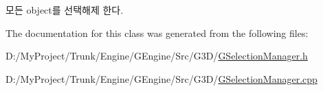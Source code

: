 \begin{DoxyItemize}
\item 모든 object를 선택해제 한다. 
\end{DoxyItemize}

The documentation for this class was generated from the following files\+:\begin{DoxyCompactItemize}
\item 
D\+:/\+My\+Project/\+Trunk/\+Engine/\+G\+Engine/\+Src/\+G3\+D/\hyperlink{_g_selection_manager_8h}{G\+Selection\+Manager.\+h}\item 
D\+:/\+My\+Project/\+Trunk/\+Engine/\+G\+Engine/\+Src/\+G3\+D/\hyperlink{_g_selection_manager_8cpp}{G\+Selection\+Manager.\+cpp}\end{DoxyCompactItemize}
